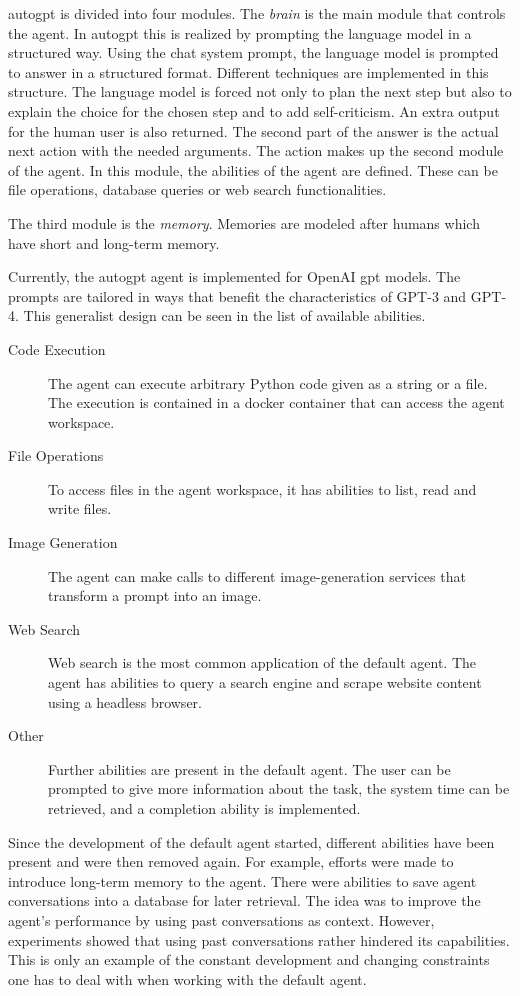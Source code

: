 \documentclass[../main.tex]{subfiles}
\begin{document}
\gls{autogpt} is divided into four modules.
The \emph{brain} is the main module that controls the agent.
In \gls{autogpt} this is realized by prompting the language model in a structured way.
Using the chat system prompt,
the language model is prompted to answer in a structured format.
Different techniques are implemented in this structure.
The language model is forced not only to plan the next step
but also to explain the choice for the chosen step and to add self-criticism.
An extra output for the human user is also returned.
The second part of the answer is the actual next action with the needed arguments.
The action makes up the second module of the agent.
In this module, the abilities of the agent are defined.
These can be file operations,
database queries or web search functionalities.

The third module is the \emph{memory}.
Memories are modeled after humans which have short and long-term memory.

Currently,
the \gls{autogpt} agent is implemented for OpenAI \gls{gpt} models.
The prompts are tailored in ways
that benefit the characteristics of GPT-3 and GPT-4.
This generalist design can be seen in the list of available abilities.
\begin{description}
      \item[Code Execution] The agent can execute arbitrary Python code given as a
            string or a file.
            The execution is contained in a docker container
            that can access the agent workspace.
      \item[File Operations] To access files in the agent workspace,
            it has abilities to list, read and write files.
      \item[Image Generation]
            The agent can make calls to different image-generation services
            that transform a prompt into an image.
      \item[Web Search]
            Web search is the most common application of the default agent.
            The agent has abilities to query a search engine
            and scrape website content using a headless browser.
      \item[Other]
            Further abilities are present in the default agent.
            The user can be prompted to give more information about the task,
            the system time can be retrieved, and a completion ability is implemented.
\end{description}
Since the development of the default agent started,
different abilities have been present and were then removed again.
For example, efforts were made to introduce long-term memory to the agent.
There were abilities to save agent conversations into a database for later retrieval.
The idea was to improve the agent's performance by using past conversations as context.
However, experiments showed that using past conversations rather hindered its capabilities. %
This is only an example of the constant development and changing constraints
one has to deal with when working with the default agent.
\end{document}
